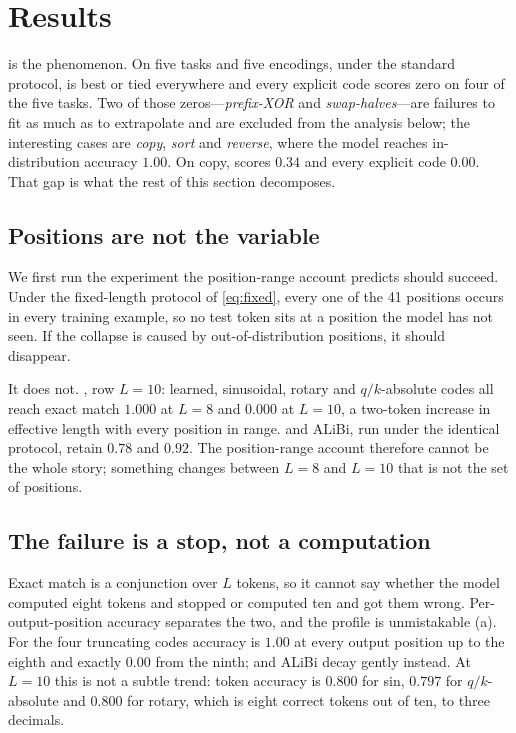 \section{Results}
\label{sec:results}



 is the phenomenon. On five tasks and five encodings, under the
standard protocol, \nope{} is best or tied everywhere and every explicit code scores
zero on four of the five tasks. Two of those zeros---\emph{prefix-XOR} and
\emph{swap-halves}---are failures to fit as much as to extrapolate and are excluded
from the analysis below; the interesting cases are \emph{copy}, \emph{sort} and
\emph{reverse}, where the model reaches in-distribution accuracy $1.00$. On copy,
\nope{} scores $0.34$ and every explicit code $0.00$. That gap is what the rest of
this section decomposes.

\subsection{Positions are not the variable}
\label{sec:padded}

We first run the experiment the position-range account predicts should succeed.
Under the fixed-length protocol of \eqref{eq:fixed}, every one of the 41 positions
occurs in every training example, so no test token sits at a position the model has
not seen. If the collapse is caused by out-of-distribution positions, it should
disappear.

It does not. , row $L{=}10$: learned, sinusoidal, rotary and
$q/k$-absolute codes all reach exact match $1.000$ at $L{=}8$ and $0.000$ at
$L{=}10$, a two-token increase in effective length with every position in range.
\nope{} and ALiBi, run under the identical protocol, retain $0.78$ and $0.92$. The
position-range account therefore cannot be the whole story; something changes
between $L{=}8$ and $L{=}10$ that is not the set of positions.



\subsection{The failure is a stop, not a computation}
\label{sec:stop}

Exact match is a conjunction over $L$ tokens, so it cannot say whether the model
computed eight tokens and stopped or computed ten and got them wrong.
Per-output-position accuracy separates the two, and the profile is unmistakable
(a). For the four truncating codes accuracy is $1.00$ at every
output position up to the eighth and exactly $0.00$ from the ninth; \nope{} and
ALiBi decay gently instead. At $L{=}10$ this is not a subtle trend: token accuracy
is $0.800$ for sin, $0.797$ for $q/k$-absolute and $0.800$ for rotary, which is
eight correct tokens out of ten, to three decimals.

